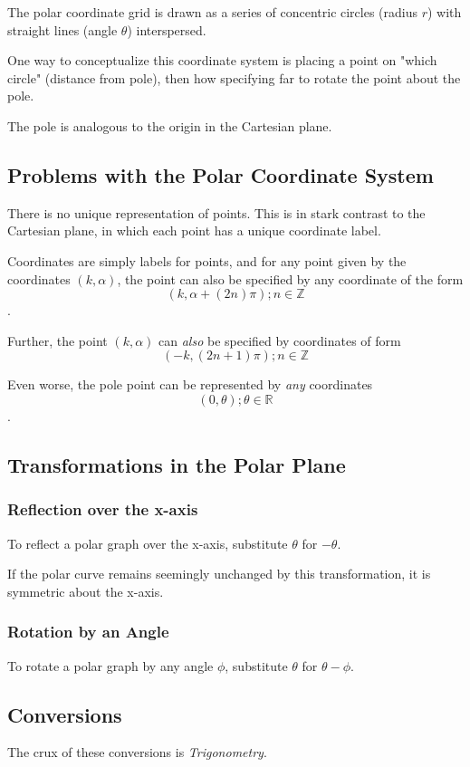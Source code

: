 \documentclass{article}
\begin{document}
The polar coordinate grid is drawn as a series of concentric circles (radius $r$) with straight lines (angle $\theta$) interspersed.

One way to conceptualize this coordinate system is placing a point on "which circle" (distance from pole), then how specifying far to rotate the point about the pole.

The pole is analogous to the origin in the Cartesian plane.

\subsection{Problems with the Polar Coordinate System}
There is no unique representation of points. This is in stark contrast to the Cartesian plane, in which each point has a unique coordinate label.

Coordinates are simply labels for points, and for any point given by the coordinates $(k, \alpha)$, the point can also be specified by any coordinate of the form $$(k, \alpha + (2n)\pi); n \in \mathbb{Z}$$.

Further, the point $(k, \alpha)$ can \emph{also} be specified by coordinates of form $$(-k, (2n+1)\pi); n \in \mathbb{Z}$$

Even worse, the pole point can be represented by \emph{any} coordinates $$(0, \theta); \theta \in \mathbb{R}$$.

\subsection{Transformations in the Polar Plane}
\subsubsection{Reflection over the x-axis}
To reflect a polar graph over the x-axis, substitute $\theta$ for $-\theta$.

If the polar curve remains seemingly unchanged by this transformation, it is symmetric about the x-axis.

\subsubsection{Rotation by an Angle}
To rotate a polar graph by any angle $\phi$, substitute $\theta$ for $\theta - \phi$.

\subsection{Conversions}
The crux of these conversions is \emph{Trigonometry}.
\end{document}
